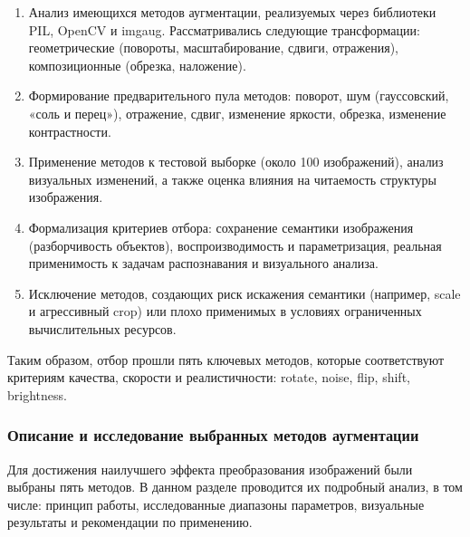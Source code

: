 \begin{enumerate}
	\item Анализ имеющихся методов аугментации, реализуемых через библиотеки PIL, OpenCV и imgaug. Рассматривались следующие трансформации: геометрические (повороты, масштабирование, сдвиги, отражения), композиционные (обрезка, наложение).
	\item Формирование предварительного пула методов: поворот, шум (гауссовский, «соль и перец»), отражение, сдвиг, изменение яркости, обрезка, изменение контрастности.
	\item Применение методов к тестовой выборке (около 100 изображений), анализ визуальных изменений, а также оценка влияния на читаемость структуры изображения.
	\item Формализация критериев отбора: сохранение семантики изображения (разборчивость объектов), воспроизводимость и параметризация, реальная применимость к задачам распознавания и визуального анализа.
	\item Исключение методов, создающих риск искажения семантики (например, scale и агрессивный crop) или плохо применимых в условиях ограниченных вычислительных ресурсов.
\end{enumerate}


Таким образом, отбор прошли пять ключевых методов, которые соответствуют критериям качества, скорости и реалистичности: rotate, noise, flip, shift, brightness.

\subsubsection{Описание и исследование выбранных методов аугментации}

Для достижения наилучшего эффекта преобразования изображений были выбраны пять методов. В данном разделе проводится их подробный анализ, в том числе: принцип работы, исследованные диапазоны параметров, визуальные результаты и рекомендации по применению.

